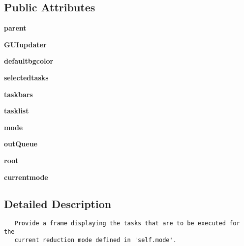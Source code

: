 \subsection*{Public Attributes}
\begin{CompactItemize}
\item 
\textbf{parent}\label{classpipeFrame_1_1window_161bdbc1c1dc5ae2b6b27bcbd93b885d}

\item 
\textbf{GUIupdater}\label{classpipeFrame_1_1window_2aa7161a56d0e64c028215f917cfa1b8}

\item 
\textbf{defaultbgcolor}\label{classpipeFrame_1_1window_33936e413678af26fe2bc8d153b34b6a}

\item 
\textbf{selectedtasks}\label{classpipeFrame_1_1window_a759eb2b6a71d53a47045e0c80e75693}

\item 
\textbf{taskbars}\label{classpipeFrame_1_1window_f87d0234b3e716908dad1c4d2fad26c6}

\item 
\textbf{tasklist}\label{classpipeFrame_1_1window_080698195d4902157a0ff9d91127029a}

\item 
\textbf{mode}\label{classpipeFrame_1_1window_e0f9c9e281da8f639b5cc8103e2a4489}

\item 
\textbf{out\-Queue}\label{classpipeFrame_1_1window_3767f9a1c1efc5578b243901b01114b9}

\item 
\textbf{root}\label{classpipeFrame_1_1window_b4c8077063c841e4a827b1911ca5ea15}

\item 
\textbf{currentmode}\label{classpipeFrame_1_1window_2aab046093bff1e9b9d73135fca3b638}

\end{CompactItemize}


\subsection{Detailed Description}


\footnotesize\begin{verbatim}
   Provide a frame displaying the tasks that are to be executed for the
   current reduction mode defined in 'self.mode'.
\end{verbatim}
\normalsize
 




